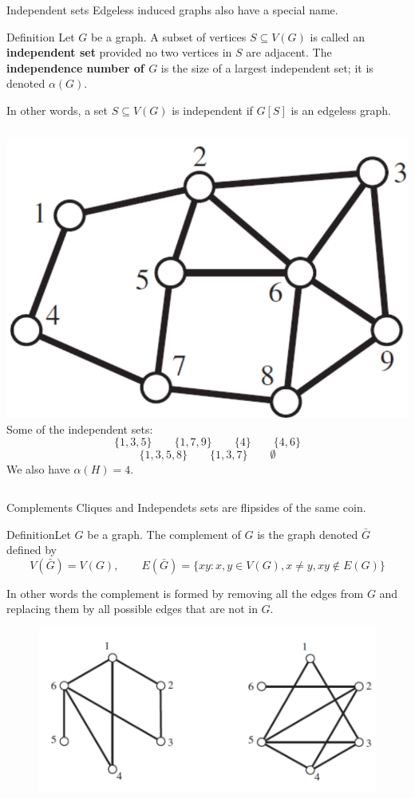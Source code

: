 \documentclass{beamer}
\def\bl[#1]#2{\begin{block}{#1}#2\end{block}}
\begin{document}
\begin{frame}{Independent sets}
Edgeless induced graphs also have a special name.
\bl[Definition]{ Let $G$ be a graph. A subset of vertices $S\subseteq V(G)$ is called an \textbf{independent set} provided no two vertices in $S$ are adjacent. The \textbf{independence number of $G$} is the size of a largest independent set; it is denoted $\alpha(G)$.}
In other words, a set $S\subseteq V(G)$ is independent if $G[S]$ is an edgeless graph.
\begin{columns}
\includegraphics[scale=0.3]{subgraphexample2.pdf}
Some of the independent sets:
\[
\{1,3,5\}\qquad\{1,7,9\}\qquad \{4\}\qquad\{4,6\}
\]
\[
\{1,3,5,8\}\qquad\{1,3,7\}\qquad\emptyset
\]
We also have $\alpha(H)=4$.
\end{columns}
\end{frame}

\begin{frame}{Complements}
Cliques and Independets sets are flipsides of the same coin.
\bl[Definition]{Let $G$ be a graph. The complement of $G$ is the graph denoted $\bar{G}$ defined by 
\[
V(\bar{G})=V(G),\qquad E(\bar{G})=\{xy:x,y\in V(G), x\neq y, xy\notin E(G)\}
\]}
In other words the complement is formed by removing all the edges from $G$ and replacing them by all possible edges that are not in $G$.\vspace{-0.3cm}
\begin{figure}
\centering
\includegraphics[scale=0.4]{Complements.pdf}
\end{figure}
\end{frame}
\end{document}
